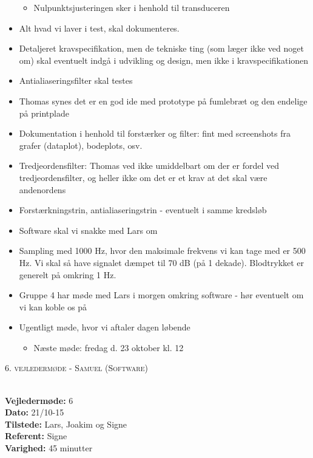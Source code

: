 \documentclass[a4paper,11pt,oneside]{memoir}
\begin{document}
\begin{itemize}
\begin{itemize}
\item Nulpunktsjusteringen sker i henhold til transduceren 
\end{itemize}
\item Alt hvad vi laver i test, skal dokumenteres. 
\item Detaljeret kravspecifikation, men de tekniske ting (som læger ikke ved noget om) skal eventuelt indgå i udvikling og design, men ikke i kravspecifikationen
\item Antialiaseringsfilter skal testes
\item Thomas synes det er en god ide med prototype på fumlebræt og den endelige på printplade
\item Dokumentation i henhold til forstærker og filter: fint med screenshots fra grafer (dataplot), bodeplots, osv.
\item Tredjeordensfilter: Thomas ved ikke umiddelbart om der er fordel ved tredjeordensfilter, og heller ikke om det er et krav at det skal være andenordens 
\item Forstærkningstrin, antialiaseringstrin - eventuelt i samme kredsløb
\item Software skal vi snakke med Lars om 
\item Sampling med 1000 Hz, hvor den maksimale frekvens vi kan tage med er 500 Hz. Vi skal så have signalet dæmpet til 70 dB (på 1 dekade). Blodtrykket er generelt på omkring 1 Hz. 
\item Gruppe 4 har møde med Lars i morgen omkring software - hør eventuelt om vi kan koble os på 
\item Ugentligt møde, hvor vi aftaler dagen løbende 
\begin{itemize}
\item Næste møde: fredag d. 23 oktober kl. 12
\end{itemize}
\end{itemize}


\newpage



\begin{center} 
\huge{\textsc{6. vejledermøde - Samuel (Software)}}
\end{center}

\textbf{ }
\\
\textbf{Vejledermøde:} 6
\\
\textbf{Dato:} 21/10-15
\\
\textbf{Tilstede:} Lars, Joakim og Signe
\\
\textbf{Referent:} Signe
\\
\textbf{Varighed:} 45 minutter
\\
\end{document}

